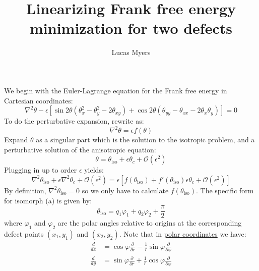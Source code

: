 \documentclass[reqno]{article}
\begin{document}
\title{Linearizing Frank free energy minimization for two defects}
\author{Lucas Myers}
\maketitle

We begin with the Euler-Lagrange equation for the Frank free energy in Cartesian coordinates:
\begin{equation} \label{eq:Euler-Lagrange}
    \nabla^2 \theta
    - \epsilon \left[
        \sin 2\theta \left(\theta_x^2 - \theta_y^2 - 2 \theta_{xy}\right)
        + \cos 2\theta \left(\theta_{yy} - \theta_{xx} - 2 \theta_x \theta_y \right)
    \right]
    =
    0
\end{equation}
To do the perturbative expansion, rewrite as:
\begin{equation*}
    \nabla^2 \theta
    = \epsilon f(\theta)
\end{equation*}
Expand $\theta$ as a singular part which is the solution to the isotropic problem, and a perturbative solution of the anisotropic equation:
\begin{equation*}
    \theta = \theta_\text{iso} + \epsilon \theta_c + \mathcal{O}(\epsilon^2)
\end{equation*}
Plugging in up to order $\epsilon$ yields:
\begin{equation*}
    \nabla^2 \theta_\text{iso}
    + \epsilon \nabla^2 \theta_c
    + \mathcal{O}(\epsilon^2)
    =
    \epsilon \left[ f(\theta_\text{iso}) + f'(\theta_\text{iso}) \epsilon \theta_c + \mathcal{O}(\epsilon^2) \right]
\end{equation*}
By definition, $\nabla^2 \theta_\text{iso} = 0$ so we only have to calculate $f(\theta_\text{iso})$.
The specific form for isomorph (a) is given by:
\begin{equation}
    \theta_\text{iso}
    =
    q_1 \varphi_1 + q_2 \varphi_2 + \frac{\pi}{2}
\end{equation}
where $\varphi_1$ and $\varphi_2$ are the polar angles relative to origins at the corresponding defect points $(x_1, y_1)$ and $(x_2, y_2)$.
Note that in \href{https://www.wikiwand.com/en/Polar_coordinate_system#Differential_calculus}{polar coordinates} we have:
\begin{equation}
    \begin{split}
        \frac{d}{dx}
        &=
        \cos \varphi \frac{\partial}{\partial r} - \frac{1}{r} \sin\varphi \frac{\partial}{\partial \varphi} \\
        \frac{d}{dy}
        &=
        \sin \varphi \frac{\partial}{\partial r} + \frac{1}{r} \cos\varphi \frac{\partial}{\partial \varphi}
    \end{split}
\end{equation}
\end{document}
